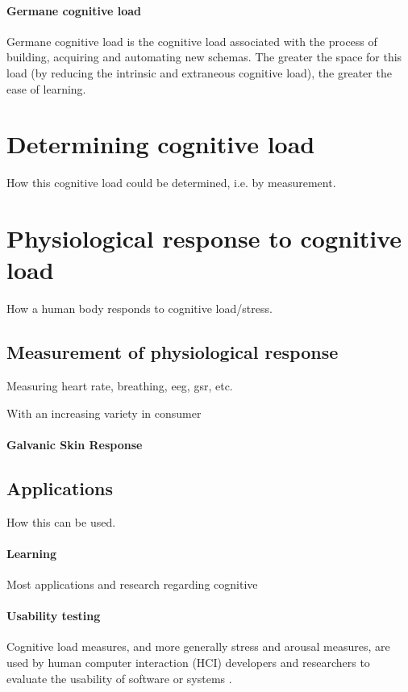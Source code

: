 \documentclass[12pt,leqno,letterpaper]{report} %
\begin{document}
\paragraph{Germane cognitive load}
Germane cognitive load is the cognitive load associated with the process of building, acquiring and automating new schemas. The greater the space for this load (by reducing the intrinsic and extraneous cognitive load), the greater the ease of learning.


\section{Determining cognitive load}
\citep{brunken2003direct}
How this cognitive load could be determined, i.e. by measurement.

\section{Physiological response to cognitive load}
How a human body responds to cognitive load/stress. 


\subsection{Measurement of physiological response}
Measuring heart rate, breathing, eeg, gsr, etc.

With an increasing variety in consumer 

\paragraph{Galvanic Skin Response}



\subsection{Applications}
How this can be used.

\paragraph{Learning}
Most applications and research regarding cognitive 


\paragraph{Usability testing}
Cognitive load measures, and more generally stress and arousal measures, are used by human computer interaction (HCI) developers and researchers to evaluate the usability of software or systems \citep{Jacob2003} \citep{Schmutz2009}.
\end{document}
